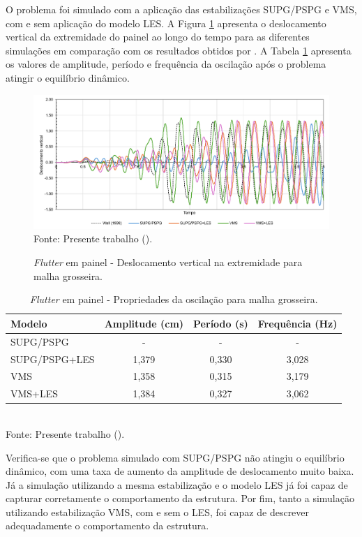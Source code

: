 O problema foi simulado com a aplicação das estabilizações SUPG/PSPG e VMS, com e sem aplicação do modelo LES. A Figura \ref{fig:prismRes2} apresenta o deslocamento vertical da extremidade do painel ao longo do tempo para as diferentes simulações em comparação com os resultados obtidos por . A Tabela \ref{tab:prismRes2} apresenta os valores de amplitude, período e frequência da oscilação após o problema atingir o equilíbrio dinâmico.

\begin{figure}[h!]
    \centering
    \caption{\textit{Flutter} em painel - Deslocamento vertical na extremidade para malha grosseira.}
    \includegraphics[width=\linewidth]{Figuras/flutter-coarse/disp_y.pdf}
    \\Fonte: Presente trabalho (\the\year).
    \label{fig:prismRes2}
\end{figure}

\begin{table}[h!]
    \centering
    \caption{\textit{Flutter} em painel - Propriedades da oscilação para malha grosseira.}
    \begin{tabular}{lccc}
        \hline
        Modelo        & Amplitude (cm) & Período (s) & Frequência (Hz) \\\hline
        SUPG/PSPG     & -              & -           & -               \\
        SUPG/PSPG+LES & 1,379          & 0,330       & 3,028           \\
        VMS           & 1,358          & 0,315       & 3,179           \\
        VMS+LES       & 1,384          & 0,327       & 3,062           \\\hline
    \end{tabular}
    \\Fonte: Presente trabalho (\the\year).
    \label{tab:prismRes2}
\end{table}

Verifica-se que o problema simulado com SUPG/PSPG não atingiu o equilíbrio dinâmico, com uma taxa de aumento da amplitude de deslocamento muito baixa. Já a simulação utilizando a mesma estabilização e o modelo LES já foi capaz de capturar corretamente o comportamento da estrutura. Por fim, tanto a simulação utilizando estabilização VMS, com e sem o LES, foi capaz de descrever adequadamente o comportamento da estrutura.